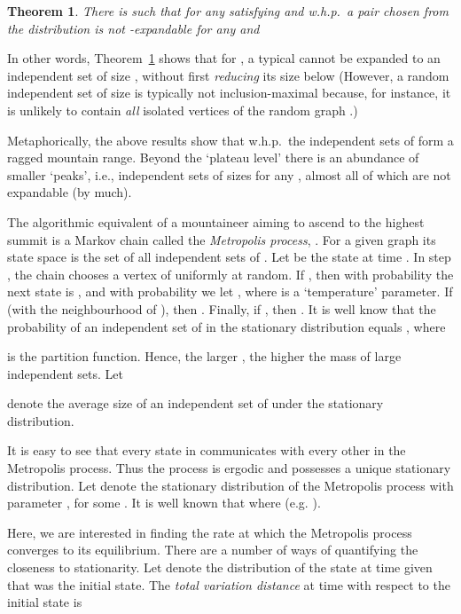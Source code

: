 \documentclass[a4paper,10pt]{article}
\newtheorem{theorem}{Theorem}\renewcommand{\thetheorem}{\arabic{theorem}}
\newcommand{\whp}{w.h.p.}
\newcommand\Thm{Theorem}
\begin{document}
\begin{theorem}\label{theorem:maximal}
There is  such that for any  satisfying 
and 	 \whp\ a pair 
chosen from the distribution  is not -expandable
for any  and 

\end{theorem}

\noindent
In other words, \Thm~\ref{theorem:maximal} shows that for , a typical 
cannot be expanded to an independent set of size ,
 without first \emph{reducing} its size below 
 (However,  a random independent set of
size  is typically not inclusion-maximal
because, for instance, it is unlikely to contain \emph{all} isolated
vertices of the random graph .)


Metaphorically, the above results show that \whp\ the independent sets of  form 
a ragged mountain range.
 Beyond the `plateau level'
 there is an abundance of smaller `peaks',
i.e., independent sets of sizes  for any ,
almost all of which are
not expandable (by much).

The algorithmic equivalent of a mountaineer aiming to ascend
to the highest summit is a Markov chain
called the \emph{Metropolis process}, \cite{KirkpatricMetropolis,Metropolis1st}.
For a given graph  its state space is the set of all independent
sets of . Let  be the state at time . In step , the
chain chooses a vertex  of  uniformly at random. If ,
then with probability  the next state is , and with probability  we let , where  is a `temperature' parameter. If  (with  the neighbourhood of ), then
. Finally, if , then .
It is well know that the probability of an independent set  of  in the stationary
distribution equals , where

is the partition function.
Hence, the larger , the higher the mass of large independent
sets. Let

denote the average size of an independent set of  under the
stationary distribution.


It is easy to see that every state in  
communicates with every other in the Metropolis process.
Thus the process is ergodic and possesses a unique stationary 
distribution. Let  denote the stationary 
distribution of the Metropolis process with parameter , 
for some . It is well known 
that   
where  (e.g. \cite{jerrum-planted}).  


Here, we are interested in finding the rate at which the Metropolis
process converges to its equilibrium. There are a number of ways
of quantifying the closeness to stationarity. Let  denote the distribution of the state at time 
given that  was the initial state. The {\em total variation
distance} at time  with respect to the initial state 
is 
\end{document}
